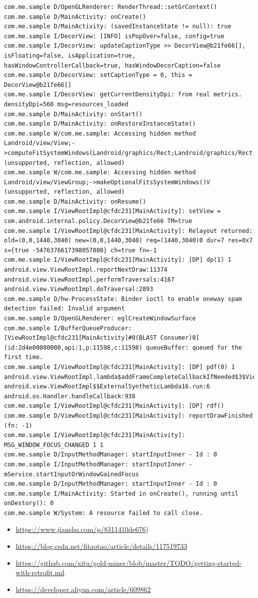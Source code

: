 \documentclass[9pt, b5paper]{article}
\begin{document}
\begin{verbatim}
com.me.sample D/OpenGLRenderer: RenderThread::setGrContext()
com.me.sample D/MainActivity: onCreate() 
com.me.sample D/MainActivity: (savedInstanceState != null): true
com.me.sample I/DecorView: [INFO] isPopOver=false, config=true
com.me.sample I/DecorView: updateCaptionType >> DecorView@b21fe66[], isFloating=false, isApplication=true, hasWindowControllerCallback=true, hasWindowDecorCaption=false
com.me.sample D/DecorView: setCaptionType = 0, this = DecorView@b21fe66[]
com.me.sample I/DecorView: getCurrentDensityDpi: from real metrics. densityDpi=560 msg=resources_loaded
com.me.sample D/MainActivity: onStart() 
com.me.sample D/MainActivity: onRestoreInstanceState() 
com.me.sample W/com.me.sample: Accessing hidden method Landroid/view/View;->computeFitSystemWindows(Landroid/graphics/Rect;Landroid/graphics/Rect;)Z (unsupported, reflection, allowed)
com.me.sample W/com.me.sample: Accessing hidden method Landroid/view/ViewGroup;->makeOptionalFitsSystemWindows()V (unsupported, reflection, allowed)
com.me.sample D/MainActivity: onResume() 
com.me.sample I/ViewRootImpl@cfdc231[MainActivity]: setView = com.android.internal.policy.DecorView@b21fe66 TM=true
com.me.sample I/ViewRootImpl@cfdc231[MainActivity]: Relayout returned: old=(0,0,1440,3040) new=(0,0,1440,3040) req=(1440,3040)0 dur=7 res=0x7 s={true -5476376617398057808} ch=true fn=-1
com.me.sample I/ViewRootImpl@cfdc231[MainActivity]: [DP] dp(1) 1 android.view.ViewRootImpl.reportNextDraw:11374 android.view.ViewRootImpl.performTraversals:4167 android.view.ViewRootImpl.doTraversal:2893 
com.me.sample D/hw-ProcessState: Binder ioctl to enable oneway spam detection failed: Invalid argument
com.me.sample D/OpenGLRenderer: eglCreateWindowSurface
com.me.sample I/BufferQueueProducer: [ViewRootImpl@cfdc231[MainActivity]#0(BLAST Consumer)0](id:2d4e00000000,api:1,p:11598,c:11598) queueBuffer: queued for the first time.
com.me.sample I/ViewRootImpl@cfdc231[MainActivity]: [DP] pdf(0) 1 android.view.ViewRootImpl.lambda$addFrameCompleteCallbackIfNeeded$3$ViewRootImpl:4969 android.view.ViewRootImpl$$ExternalSyntheticLambda16.run:6 android.os.Handler.handleCallback:938 
com.me.sample I/ViewRootImpl@cfdc231[MainActivity]: [DP] rdf()
com.me.sample D/ViewRootImpl@cfdc231[MainActivity]: reportDrawFinished (fn: -1) 
com.me.sample I/ViewRootImpl@cfdc231[MainActivity]: MSG_WINDOW_FOCUS_CHANGED 1 1
com.me.sample D/InputMethodManager: startInputInner - Id : 0
com.me.sample I/InputMethodManager: startInputInner - mService.startInputOrWindowGainedFocus
com.me.sample D/InputMethodManager: startInputInner - Id : 0
com.me.sample I/MainActivity: Started in onCreate(), running until onDestory(): 0
com.me.sample W/System: A resource failed to call close.
\end{verbatim}
\begin{itemize}
\item \url{https://www.jianshu.com/p/8311410de676})
\item \url{https://blog.csdn.net/fitaotao/article/details/117519733}
\item \url{https://github.com/xitu/gold-miner/blob/master/TODO/getting-started-with-retrofit.md}
\item \url{https://developer.aliyun.com/article/609862}
\end{itemize}
\end{document}

